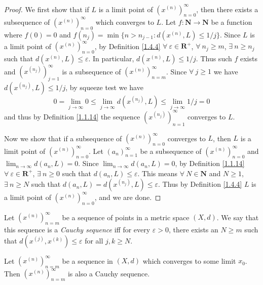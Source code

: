 \begin{proof}
    We first show that if \(L\) is a limit point of \((x^{(n)})_{n = 0}^\infty\), then there exists a subsequence of \((x^{(n)})_{n = 0}^\infty\) which converges to \(L\).
    Let \(f : \mathbf{N} \to \mathbf{N}\) be a function where \(f(0) = 0\) and \(f(n_j) = \min\{n > n_{j - 1} : d(x^{(n)}, L) \leq 1 / j\}\).
    Since \(L\) is a limit point of \((x^{(n)})_{n = 0}^\infty\), by Definition \ref{1.4.4} \(\forall\ \varepsilon \in \mathbf{R}^+\), \(\forall\ n_j \geq m\), \(\exists\ n \geq n_j\) such that \(d(x^{(n)}, L) \leq \varepsilon\).
    In particular, \(d(x^{(n)}, L) \leq 1 / j\).
    Thus such \(f\) exists and \((x^{(n_j)})_{j = 1}^\infty\) is a subsequence of \((x^{(n)})_{n = m}^\infty\).
    Since \(\forall\ j \geq 1\) we have \(d(x^{(n_j)}, L) \leq 1 / j\), by squeeze test we have
    \[
        0 = \lim_{j \to \infty} 0 \leq \lim_{j \to \infty} d(x^{(n_j)}, L) \leq \lim_{j \to \infty} 1 / j = 0
    \]
    and thus by Definition \ref{1.1.14} the sequence \((x^{(n_j)})_{n = 1}^\infty\) converges to \(L\).

    Now we show that if a subsequence of \((x^{(n)})_{n = 0}^\infty\) converges to \(L\), then \(L\) is a limit point of \((x^{(n)})_{n = 0}^\infty\).
    Let \((a_n)_{n = 1}^\infty\) be a subsequence of \((x^{(n)})_{n = 0}^\infty\) and \(\lim_{n \to \infty} d(a_n, L) = 0\).
    Since \(\lim_{n \to \infty} d(a_n, L) = 0\), by Definition \ref{1.1.14} \(\forall\ \varepsilon \in \mathbf{R}^+\), \(\exists\ n \geq 0\) such that \(d(a_n, L) \leq \varepsilon\).
    This means \(\forall\ N \in \mathbf{N}\) and \(N \geq 1\), \(\exists\ n \geq N\) such that \(d(a_n, L) = d(x^{(n_j)}, L) \leq \varepsilon\).
    Thus by Definition \ref{1.4.4} \(L\) is a limit point of \((x^{(n)})_{n = 0}^\infty\), and we are done.
\end{proof}

\begin{definition}\label{1.4.6}
    Let \((x^{(n)})_{n = m}^\infty\) be a sequence of points in a metric space \((X, d)\).
    We say that this sequence is a \emph{Cauchy sequence} iff for every \(\varepsilon > 0\), there exists an \(N \geq m\) such that \(d(x^{(j)}, x^{(k)}) \leq \varepsilon\) for all \(j, k \geq N\).
\end{definition}

\begin{lemma}\label{1.4.7}
    Let \((x^{(n)})_{n = m}^\infty\) be a sequence in \((X, d)\) which converges to some limit \(x_0\).
    Then \((x^{(n)})_{n = m}^\infty\) is also a Cauchy sequence.
\end{lemma}

